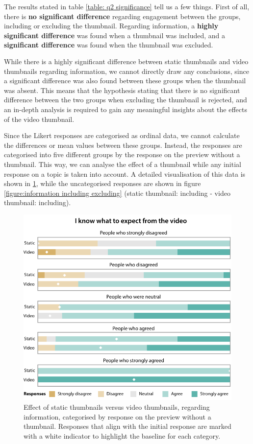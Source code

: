 \documentclass{../resources/sig-alternate-05-2015}
\begin{document}
The results stated in table \ref{table: q2 significance} tell us a few things. First of all, there is \textbf{no significant difference} regarding engagement between the groups, including or excluding the thumbnail. Regarding information, a \textbf{highly significant difference} was found when a thumbnail was included, and a \textbf{significant difference} was found when the thumbnail was excluded.

While there is a highly significant difference between static thumbnails and video thumbnails regarding information, we cannot directly draw any conclusions, since a significant difference was also found between these groups when the thumbnail was absent. This means that the hypothesis stating that there is no significant difference between the two groups when excluding the thumbnail is rejected, and an in-depth analysis is required to gain any meaningful insights about the effects of the video thumbnail.

Since the Likert responses are categorised as ordinal data, we cannot calculate the differences or mean values between these groups. Instead, the responses are categorised into five different groups by the response on the preview without a thumbnail. This way, we can analyse the effect of a thumbnail while any initial response on a topic is taken into account. A detailed visualisation of this data is shown in \ref{figure:information static versus video}, while the uncategorised responses are shown in figure \ref{figure:information including excluding} (static thumbnail: including - video thumbnail: including).

\begin{figure}[h]
	\includegraphics[width=\linewidth]{resources/information_static_video}
	\caption{Effect of static thumbnails versus video thumbnails, regarding information, categorised by response on the preview without a thumbnail. Responses that align with the initial response are marked with a white indicator to highlight the baseline for each category.}
	\label{figure:information static versus video}
\end{figure}
\end{document}

